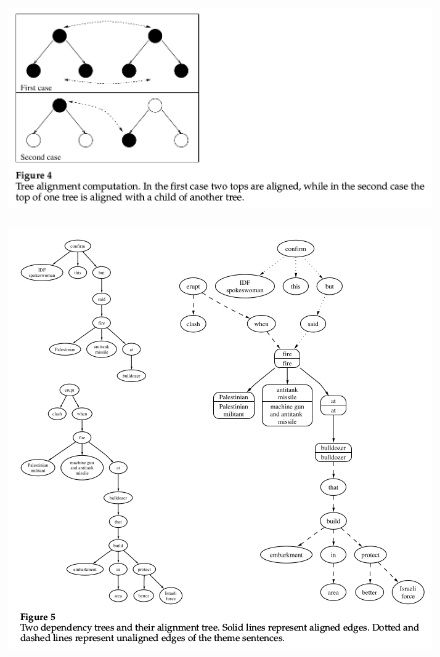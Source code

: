 \documentclass[xcolor={table}]{beamer}
\begin{document}
\begin{frame}[t]{\cite{barzilay2005sentence}}
      \begin{figure}[h]
          \centering
      \includegraphics[scale=.3]{images/figure4-barzilay05.png} \\
\end{figure}
\end{frame}
\begin{frame}[t]{\cite{barzilay2005sentence}}
      \begin{figure}[h]
          \centering
      \includegraphics[scale=.3]{images/figure5-barzilay05.png} \\
\end{figure}
\end{frame}
\end{document}
